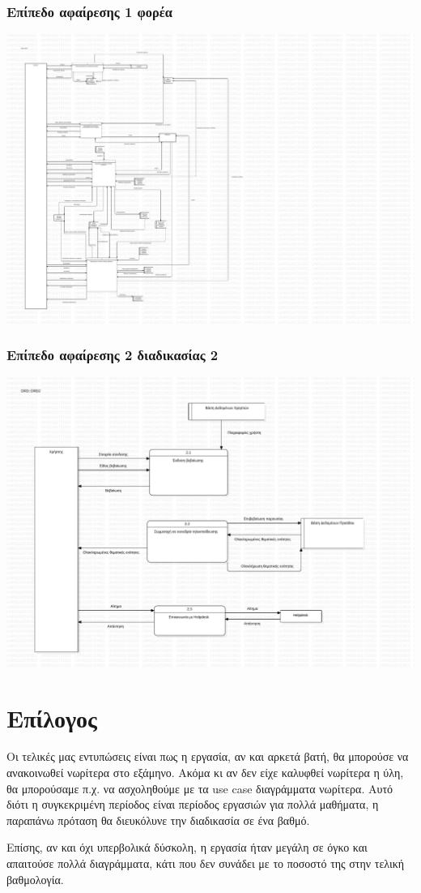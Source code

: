 \documentclass[a4paper, titlepage, twoside]{article}
\begin{document}
\subsubsection*{Επίπεδο αφαίρεσης 1 φορέα}
\label{sec:orgbeeab31}
\begin{center}
\includegraphics[width=.9\linewidth]{drd1.pdf}
\end{center}
\subsubsection*{Επίπεδο αφαίρεσης 2 διαδικασίας 2}
\label{sec:org8df7b21}
\begin{center}
\includegraphics[width=.9\linewidth]{drd2.pdf}
\end{center}

\section{Επίλογος}
\label{sec:orgd061354}

Οι τελικές μας εντυπώσεις είναι πως η εργασία, αν και αρκετά βατή, θα μπορούσε να ανακοινωθεί νωρίτερα στο εξάμηνο. Ακόμα κι αν δεν είχε καλυφθεί νωρίτερα η ύλη, θα μπορούσαμε π.χ. να ασχοληθούμε με τα use case διαγράμματα νωρίτερα. Αυτό διότι η συγκεκριμένη περίοδος είναι περίοδος εργασιών για πολλά μαθήματα, η παραπάνω πρόταση θα διευκόλυνε την διαδικασία σε ένα βαθμό.

Επίσης, αν και όχι υπερβολικά δύσκολη, η εργασία ήταν μεγάλη σε όγκο και απαιτούσε πολλά διαγράμματα, κάτι που δεν συνάδει με το ποσοστό της στην τελική βαθμολογία.
\end{document}
